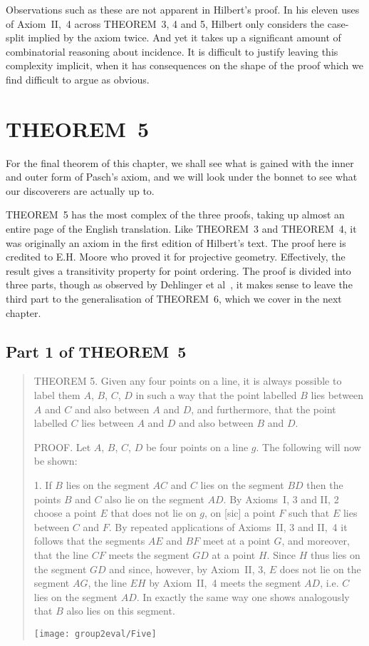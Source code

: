 Observations such as these are not apparent in Hilbert's proof. In his eleven uses of Axiom~II,~4 across THEOREM~3, 4 and 5, Hilbert only considers the case-split implied by the axiom twice. And yet it takes up a significant amount of combinatorial reasoning about incidence. It is difficult to justify leaving this complexity implicit, when it has consequences on the shape of the proof which we find difficult to argue as obvious. 

\section{THEOREM~5}\label{sec:Theorem5}
For the final theorem of this chapter, we shall see what is gained with the inner and outer form of Pasch's axiom, and we will look under the bonnet to see what our discoverers are actually up to.

THEOREM~5 has the most complex of the three proofs, taking up almost an entire page of the English translation. Like THEOREM~3 and THEOREM~4, it was originally an axiom in the first edition of Hilbert's text. The proof here is credited to E.H. Moore who proved it for projective geometry. Effectively, the result gives a transitivity property for point ordering. The proof is divided into three parts, though as observed by Dehlinger et al~\cite{DehlingerFOG}, it makes sense to leave the third part to the generalisation of THEOREM~6, which we cover in the next chapter.

\subsection{Part 1 of THEOREM~5}
\begin{quotation}
THEOREM 5. Given any four points on a line, it is always possible to label them $A$, $B$, $C$, $D$ in such a way that the point labelled $B$ lies between $A$ and $C$ and also between $A$ and $D$, and furthermore, that the point labelled $C$ lies between $A$ and $D$ and also between $B$ and $D$.

PROOF. Let $A$, $B$, $C$, $D$ be four points on a line $g$. The following will now be shown:

1. If $B$ lies on the segment $AC$ and $C$ lies on the segment $BD$ then the points $B$ and $C$ also lie on the segment $AD$. By Axioms~I, 3 and II, 2 choose a point $E$ that does not lie on $g$, on [sic] a point $F$ such that $E$ lies between $C$ and $F$. By repeated applications of Axioms~II, 3 and II,~4 it follows that the segments $AE$ and $BF$ meet at a point $G$, and moreover, that the line $CF$ meets the segment $GD$ at a point $H$. Since $H$ thus lies on the segment $GD$ and since, however, by Axiom~II, 3, $E$ does not lie on the segment $AG$, the line $EH$ by Axiom~II,~4 meets the segment $AD$, i.e. $C$ lies on the segment $AD$. In exactly the same way one shows analogously that $B$ also lies on this segment.

\centering\texttt{[image: group2eval/Five]}
\end{quotation}

